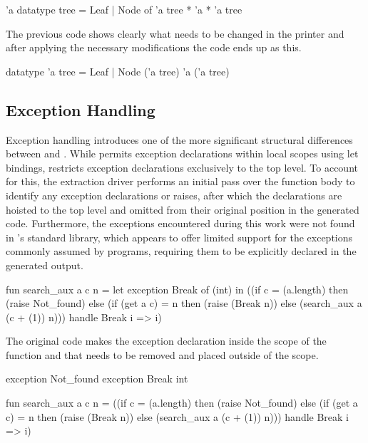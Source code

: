 \begin{cakeml}
    'a datatype tree = Leaf | Node of 'a tree * 'a * 'a tree
\end{cakeml}

The previous code shows clearly what needs to be changed in the printer and after applying the necessary modifications the code ends up as this.

\begin{cakeml}
    datatype 'a tree = Leaf | Node ('a tree) 'a ('a tree)
\end{cakeml}


\subsection{Exception Handling}

Exception handling introduces one of the more significant structural differences between \whyml and \cml. While \whyml permits exception declarations within local scopes 
using let bindings, \cml restricts exception declarations exclusively to the top level. To account for this, the extraction driver performs an initial pass over the function 
body to identify any exception declarations or raises, after which the declarations are hoisted to the top level and omitted from their original position in the generated code. 
Furthermore, the exceptions encountered during this work were not found in \cml's standard library, which appears to offer limited support for the exceptions commonly assumed 
by \whyml programs, requiring them to be explicitly declared in the generated output.

\begin{cakeml}
    fun search_aux a c n = 
    let exception Break of (int) in
    ((if c = (a.length) then (raise Not_found) 
        else (if (get a c) = n then (raise (Break n)) 
            else (search_aux a (c + (1)) n)))
    handle   Break i => i)
\end{cakeml}

The original code makes the exception declaration inside the scope of the function and that needs to be removed and placed outside of the scope.

\begin{cakeml}
    exception Not_found
    exception Break int

    fun search_aux a c n = 
    ((if c = (a.length) then (raise Not_found) 
        else (if (get a c) = n then (raise (Break n)) 
            else (search_aux a (c + (1)) n)))
    handle   Break i => i)
\end{cakeml}

